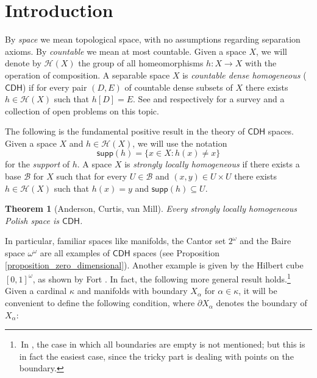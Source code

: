 \documentclass{amsart}
\theoremstyle{plain}
\newtheorem{theorem}{Theorem}[section]
\theoremstyle{definition}
\newcommand{\supp}{\mathsf{supp}}
\newcommand{\CDH}{\mathsf{CDH}}
\newcommand{\BB}{\mathcal{B}}
\newcommand{\HH}{\mathcal{H}}
\begin{document}


\maketitle

\tableofcontents

\section{Introduction}\label{section_introduction}

By \emph{space} we mean topological space, with no assumptions regarding separation axioms. By \emph{countable} we mean at most countable. Given a space $X$, we will denote by $\HH(X)$ the group of all homeomorphisms $h:X\longrightarrow X$ with the operation of composition. A separable space $X$ is \emph{countable dense homogeneous} ($\CDH$) if for every pair $(D,E)$ of countable dense subsets of $X$ there exists $h\in\HH(X)$ such that $h[D]=E$. See \cite[Sections 14-16]{arhangelskii_van_mill} and \cite{hrusak_van_mill} respectively for a survey and a collection of open problems on this topic.

The following \cite[Theorem 5.2]{anderson_curtis_van_mill} is the fundamental positive result in the theory of $\CDH$ spaces. Given a space $X$ and $h\in\HH(X)$, we will use the notation
$$
\supp(h)=\{x\in X:h(x)\neq x\}
$$
for the \emph{support} of $h$. A space $X$ is \emph{strongly locally homogeneous} if there exists a base $\BB$ for $X$ such that for every $U\in\BB$ and $(x,y)\in U\times U$ there exists $h\in\HH(X)$ such that $h(x)=y$ and $\supp(h)\subseteq U$.

\begin{theorem}[Anderson, Curtis, van Mill]\label{theorem_fundamental}
Every strongly locally homogeneous Polish space is $\CDH$.
\end{theorem}

In particular, familiar spaces like manifolds, the Cantor set $2^\omega$ and the Baire space $\omega^\omega$ are all examples of $\CDH$ spaces (see Proposition \ref{proposition_zero_dimensional}). Another example is given by the Hilbert cube $[0,1]^\omega$, as shown by Fort \cite[Theorem 2]{fort}. In fact, the following more general result \cite[Corollary 2 and Remark 2]{yang} holds.\footnote{\,In \cite[Remark 2]{yang}, the case in which all boundaries are empty is not mentioned; but this is in fact the easiest case, since the tricky part is dealing with points on the boundary.} Given a cardinal $\kappa$ and manifolds with boundary $X_\alpha$ for $\alpha\in\kappa$, it will be convenient to define the following condition, where $\partial X_\alpha$ denotes the boundary of $X_\alpha$:
\end{document}

